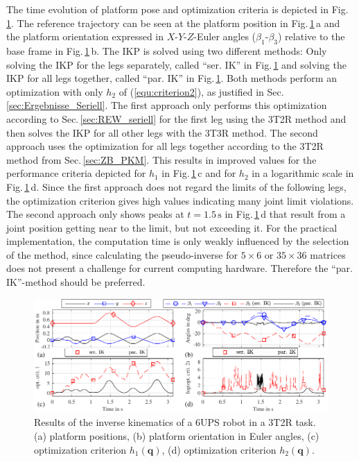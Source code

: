 \documentclass[robotics,article,submit,moreauthors,pdftex]{Definitions/mdpi}
\newcommand{\bm}[1]{\boldsymbol{#1}}
\begin{document}
The time evolution of platform pose and optimization criteria is depicted in Fig.\,\ref{fig:parrob_traj_3T2R}.
The reference trajectory can be seen at the platform position in Fig.\,\ref{fig:parrob_traj_3T2R}\,a and the platform orientation expressed in $X$-$Y$-$Z$-Euler angles ($\beta_1$-$\beta_3$) relative to the base frame in Fig.\,\ref{fig:parrob_traj_3T2R}\,b.
The IKP is solved using two different methods: Only solving the IKP for the legs separately, called ``ser. IK'' in Fig.\,\ref{fig:parrob_traj_3T2R} and solving the IKP for all legs together, called ``par. IK'' in Fig.\,\ref{fig:parrob_traj_3T2R}.
Both methods perform an optimization with only $h_2$ of (\ref{equ:criterion2}), as justified in Sec.\,\ref{sec:Ergebnisse_Seriell}.
The first approach only performs this optimization according to Sec.\,\ref{sec:REW_seriell} for the first leg using the 3T2R method and then solves the IKP for all other legs with the 3T3R method.
The second approach uses the optimization for all legs together according to the 3T2R method from Sec.\,\ref{sec:ZB_PKM}.
This results in improved values for the performance criteria depicted for $h_1$ in Fig.\,\ref{fig:parrob_traj_3T2R}\,c and for $h_2$ in a logarithmic scale in Fig.\,\ref{fig:parrob_traj_3T2R}\,d.
Since the first approach does not regard the limits of the following legs, the optimization criterion gives high values indicating many joint limit violations.
The second approach only shows peaks at $t=1.5\,\mathrm{s}$ in Fig.\,\ref{fig:parrob_traj_3T2R}\,d that result from a joint position getting near to the limit, but not exceeding it.
For the practical implementation, the computation time is only weakly influenced by the selection of the method, since calculating the pseudo-inverse for $5 \times 6$ or $35 \times 36$ matrices does not present a challenge for current computing hardware.
Therefore the ``par. IK''-method should be preferred.

%
\begin{figure}[b]
	\vspace{-0.5cm} %
	\includegraphics{parrob_traj_results1.pdf}
	\caption{Results of the inverse kinematics of a 6UPS robot in a 3T2R task. (a) platform positions, (b) platform orientation in Euler angles, (c) optimization criterion $h_1(\bm{{q}})$, (d) optimization criterion $h_2(\bm{{q}})$.}
	\label{fig:parrob_traj_3T2R}
\end{figure} 
\end{document}
